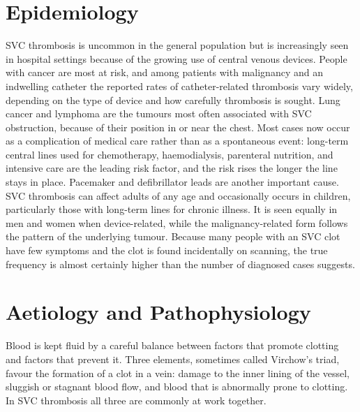 \section*{Epidemiology}
SVC thrombosis is uncommon in the general population but is increasingly seen in hospital settings because of the growing use of central venous devices. People with cancer are most at risk, and among patients with malignancy and an indwelling catheter the reported rates of catheter-related thrombosis vary widely, depending on the type of device and how carefully thrombosis is sought. Lung cancer and lymphoma are the tumours most often associated with SVC obstruction, because of their position in or near the chest. Most cases now occur as a complication of medical care rather than as a spontaneous event: long-term central lines used for chemotherapy, haemodialysis, parenteral nutrition, and intensive care are the leading risk factor, and the risk rises the longer the line stays in place. Pacemaker and defibrillator leads are another important cause. SVC thrombosis can affect adults of any age and occasionally occurs in children, particularly those with long-term lines for chronic illness. It is seen equally in men and women when device-related, while the malignancy-related form follows the pattern of the underlying tumour. Because many people with an SVC clot have few symptoms and the clot is found incidentally on scanning, the true frequency is almost certainly higher than the number of diagnosed cases suggests.

\section*{Aetiology and Pathophysiology}
Blood is kept fluid by a careful balance between factors that promote clotting and factors that prevent it. Three elements, sometimes called Virchow's triad, favour the formation of a clot in a vein: damage to the inner lining of the vessel, sluggish or stagnant blood flow, and blood that is abnormally prone to clotting. In SVC thrombosis all three are commonly at work together.

